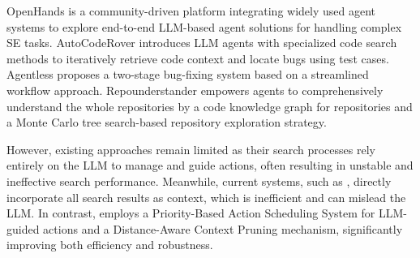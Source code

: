OpenHands \citep{wang2024openhands} is a community-driven platform integrating widely used agent systems to explore end-to-end LLM-based agent solutions for handling complex SE tasks. 
AutoCodeRover \citep{zhang2024autocoderover} introduces LLM agents with specialized code search methods to iteratively retrieve code context and locate bugs using test cases.
Agentless \citep{xia2024agentless} proposes a two-stage bug-fixing system based on a streamlined workflow approach.
Repounderstander \citep{ma2024understand} empowers agents to comprehensively understand the whole repositories by a code knowledge graph for repositories and a Monte Carlo tree search-based repository exploration strategy.

However, existing approaches remain limited as their search processes rely entirely on the LLM to manage and guide actions, often resulting in unstable and ineffective search performance. Meanwhile, current systems, such as \cite{autocoderover,xia2024agentless}, directly incorporate all search results as context, which is inefficient and can mislead the LLM. In contrast, \nickname employs a Priority-Based Action Scheduling System for LLM-guided actions and a Distance-Aware Context Pruning mechanism, significantly improving both efficiency and robustness.
